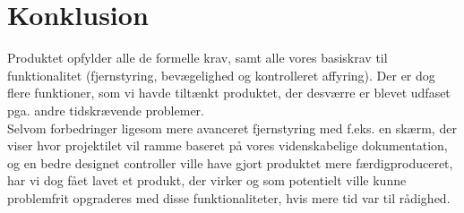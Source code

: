 \section{Konklusion}
Produktet opfylder alle de formelle krav, samt alle vores basiskrav til funktionalitet (fjernstyring, bevægelighed og kontrolleret affyring). Der er dog flere funktioner, som vi havde tiltænkt produktet, der desværre er blevet udfaset pga. andre tidskrævende problemer. \\

Selvom forbedringer ligesom mere avanceret fjernstyring med f.eks. en skærm, der viser hvor projektilet vil ramme baseret på vores videnskabelige dokumentation, og en bedre designet controller ville have gjort produktet mere færdigproduceret, har vi dog fået lavet et produkt, der virker og som potentielt ville kunne problemfrit opgraderes med disse funktionaliteter, hvis mere tid var til rådighed.

